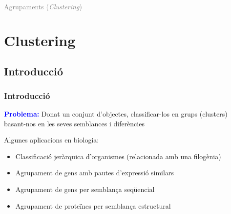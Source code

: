 \documentclass[12pt,t]{beamer}
\title[\red{Matemàtiques III}]{}
\author[]{}
\date{}
\newcommand{\blue}[1]{\textcolor{blue}{#1}}
\newcommand{\gray}[1]{\textcolor{gray}{#1}}
\renewcommand{\emph}[1]{{\color{red}#1}}
\theoremstyle{plain}
\theoremstyle{definition}
\begin{document}
\beamertemplatedotitem

\lstset{breaklines=true}
\lstset{basicstyle=\ttfamily}
\lstset{extendedchars=true}
\lstset{showstringspaces=false}

\begin{frame}
\vfill
\begin{center}
\gray{\LARGE Agrupaments (\textsl{Clustering})}
\end{center}
\vfill
\end{frame}

\section{Clustering}
\subsection{Introducció}
\begin{frame}
\frametitle{Introducció}

\blue{\bf Problema:} Donat un conjunt d'objectes, classificar-los en grups (\emph{clusters})  basant-nos en les seves semblances i diferències
\medskip

Algunes aplicacions en biologia:
\begin{itemize}
\item Classificació jeràrquica d'organismes (relacionada amb una filogènia)

\item Agrupament de gens amb pautes d'expressió similars

\item Agrupament de gens per semblança seqüencial

\item Agrupament de proteïnes per semblança estructural
\end{itemize}
\end{frame}
\end{document}
